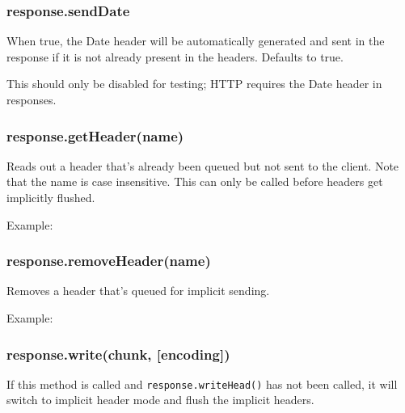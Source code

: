 \subsubsection{response.sendDate}

When true, the Date header will be automatically generated and sent in
the response if it is not already present in the headers. Defaults to
true.

This should only be disabled for testing; HTTP requires the Date header
in responses.

\subsubsection{response.getHeader(name)}

Reads out a header that's already been queued but not sent to the
client. Note that the name is case insensitive. This can only be called
before headers get implicitly flushed.

Example:

\begin{Shaded}
\begin{Highlighting}[]
 \NormalTok{(}\NormalTok{);}
\end{Highlighting}
\end{Shaded}

\subsubsection{response.removeHeader(name)}

Removes a header that's queued for implicit sending.

Example:

\begin{Shaded}
\begin{Highlighting}[]
\NormalTok{(}\NormalTok{);}
\end{Highlighting}
\end{Shaded}

\subsubsection{response.write(chunk, {[}encoding{]})}

If this method is called and \texttt{response.writeHead()} has not been
called, it will switch to implicit header mode and flush the implicit
headers.

